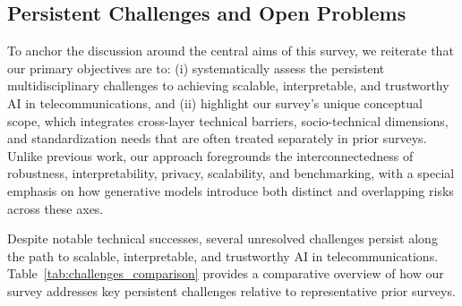 \documentclass[sigconf]{acmart}
\begin{document}
\subsection{Persistent Challenges and Open Problems}

To anchor the discussion around the central aims of this survey, we reiterate that our primary objectives are to: (i) systematically assess the persistent multidisciplinary challenges to achieving scalable, interpretable, and trustworthy AI in telecommunications, and (ii) highlight our survey's unique conceptual scope, which integrates cross-layer technical barriers, socio-technical dimensions, and standardization needs that are often treated separately in prior surveys. Unlike previous work, our approach foregrounds the interconnectedness of robustness, interpretability, privacy, scalability, and benchmarking, with a special emphasis on how generative models introduce both distinct and overlapping risks across these axes.

Despite notable technical successes, several unresolved challenges persist along the path to scalable, interpretable, and trustworthy AI in telecommunications. Table~\ref{tab:challenges_comparison} provides a comparative overview of how our survey addresses key persistent challenges relative to representative prior surveys.
\end{document}
